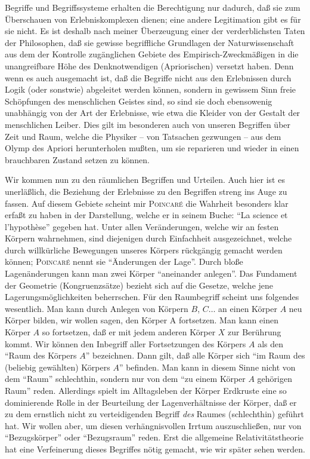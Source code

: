 
Begriffe und Begriffssysteme erhalten die Berechtigung nur dadurch, daß sie zum Überschauen von Erlebniskomplexen dienen; eine andere Legitimation gibt es für sie nicht. Es ist deshalb nach meiner Überzeugung einer der verderblichsten Taten der Philosophen, daß sie gewisse begriffliche Grundlagen der Naturwissenschaft aus dem der Kontrolle zugänglichen Gebiete des Empirisch-Zweckmäßigen in die unangreifbare Höhe des Denknotwendigen (Apriorischen) versetzt haben. Denn wenn es auch ausgemacht ist, daß die Begriffe nicht aus den Erlebnissen durch Logik (oder sonstwie) abgeleitet werden können, sondern in gewissem Sinn freie Schöpfungen des menschlichen Geistes sind, so sind sie doch ebensowenig unabhängig von der Art der Erlebnisse, wie etwa die Kleider von der Gestalt der menschlichen Leiber. Dies gilt im besonderen auch von unseren Begriffen über Zeit und Raum, welche die Physiker -- von Tatsachen gezwungen -- aus dem Olymp des Apriori herunterholen mußten, um sie reparieren und wieder in einen brauchbaren Zustand setzen zu können.

Wir kommen nun zu den räumlichen Begriffen und Urteilen. Auch hier ist es unerläßlich, die Beziehung der Erlebnisse zu den Begriffen streng ins Auge zu fassen. Auf diesem Gebiete scheint mir \textsc{Poincar\'e} die Wahrheit besonders klar erfaßt zu haben in der Darstellung, welche er in seinem Buche: \enquote{La science et l'hypothèse} gegeben hat. Unter allen Veränderungen, welche wir an festen Körpern wahrnehmen, sind diejenigen durch Einfachheit ausgezeichnet, welche durch willkürliche Bewegungen unseres Körpers rückgängig gemacht werden können; \textsc{Poincar\'e} nennt sie \enquote{Änderungen der Lage}. Durch bloße Lagenänderungen kann man zwei Körper \enquote{aneinander anlegen}. Das Fundament der Geometrie (Kongruenzsätze) bezieht sich auf die Gesetze, welche jene Lagerungsmöglichkeiten beherrschen. Für den Raumbegriff scheint uns folgendes wesentlich. Man kann durch Anlegen von Körpern $B$, $C \ldots$ an einen Körper $A$ neu Körper bilden, wir wollen sagen, den Körper A fortsetzen. Man kann einen Körper $A$ so fortsetzen, daß er mit jedem anderen Körper $X$ zur Berührung kommt. Wir können den Inbegriff aller Fortsetzungen des Körpers $A$ als den \enquote{Raum des Körpers $A$} bezeichnen. Dann gilt, daß alle Körper sich \enquote{im Raum des (beliebig gewählten) Körpers $A$} befinden. Man kann in diesem Sinne nicht von dem \enquote{Raum} schlechthin, sondern nur von dem \enquote{zu einem Körper $A$ gehörigen Raum} reden. Allerdings spielt im Alltagsleben der Körper Erdkruste eine so dominierende Rolle in der Beurteilung der Lagenverhältnisse der Körper, daß er zu dem ernstlich nicht zu verteidigenden Begriff \emph{des} Raumes (schlechthin) geführt hat. Wir wollen aber, um diesen verhängnisvollen Irrtum auszuschließen, nur von \enquote{Bezugskörper} oder \enquote{Bezugsraum} reden. Erst die allgemeine Relativitätstheorie hat eine Verfeinerung dieses Begriffes nötig gemacht, wie wir später sehen werden.


